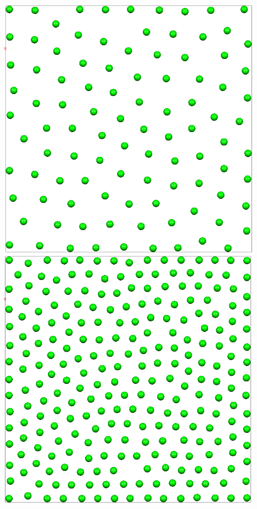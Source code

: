 \documentclass[10pt,a4paper]{report}
\begin{document}
\includegraphics[scale=0.25]{100.png}\\
\includegraphics[scale=0.25]{250.png}
\end{document}
